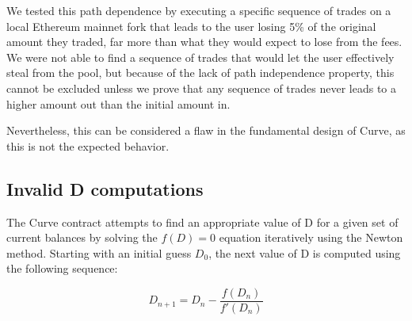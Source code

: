 \documentclass{article}
\begin{document}
    We tested this path dependence by executing a specific sequence of trades on a local Ethereum mainnet fork that leads to the user losing 5\% of the original amount they traded, far more than what they would expect to lose from the fees. We were not able to find a sequence of trades that would let the user effectively steal from the pool, but because of the lack of path independence property, this cannot be excluded unless we prove that any sequence of trades never leads to a higher amount out than the initial amount in.

    Nevertheless, this can be considered a flaw in the fundamental design of Curve, as this is not the expected behavior. 

    \subsection{Invalid D computations}
    
    The Curve contract attempts to find an appropriate value of D for a given set of current balances by solving the $f(D) = 0$ equation iteratively using the Newton method. Starting with an initial guess $D_{0}$, the next value of D is computed using the following sequence: 

    \begin{equation}
        D_{n+1} = D_{n} - \frac{f(D_{n})}{f'(D_{n})}
    \end{equation}
\end{document}
